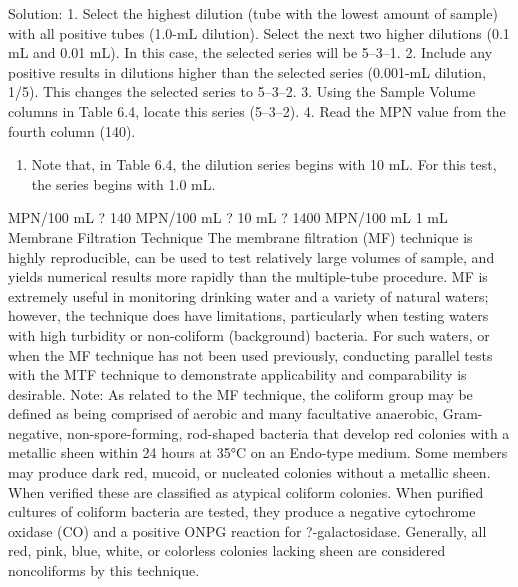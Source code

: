 \documentclass{article}
\begin{document}
Solution: 1. Select the highest dilution (tube with the lowest amount of
sample) with all positive tubes (1.0-mL dilution). Select the next two
higher dilutions (0.1 mL and 0.01 mL). In this case, the selected series
will be 5--3--1. 2. Include any positive results in dilutions higher
than the selected series (0.001-mL dilution, 1/5). This changes the
selected series to 5--3--2. 3. Using the Sample Volume columns in Table
6.4, locate this series (5--3--2). 4. Read the MPN value from the fourth
column (140).

\begin{enumerate}
\def\labelenumi{\arabic{enumi}.}
\setcounter{enumi}{4}
\tightlist
\item
  Note that, in Table 6.4, the dilution series begins with 10 mL. For
  this test, the series begins with 1.0 mL.
\end{enumerate}

MPN/100 mL ? 140 MPN/100 mL ? 10 mL ? 1400 MPN/100 mL 1 mL Membrane
Filtration Technique The membrane filtration (MF) technique is highly
reproducible, can be used to test relatively large volumes of sample,
and yields numerical results more rapidly than the multiple-tube
procedure. MF is extremely useful in monitoring drinking water and a
variety of natural waters; however, the technique does have limitations,
particularly when testing waters with high turbidity or non-coliform
(background) bacteria. For such waters, or when the MF technique has not
been used previously, conducting parallel tests with the MTF technique
to demonstrate applicability and comparability is desirable. Note: As
related to the MF technique, the coliform group may be defined as being
comprised of aerobic and many facultative anaerobic, Gram-negative,
non-spore-forming, rod-shaped bacteria that develop red colonies with a
metallic sheen within 24 hours at 35°C on an Endo-type medium. Some
members may produce dark red, mucoid, or nucleated colonies without a
metallic sheen. When verified these are classified as atypical coliform
colonies. When purified cultures of coliform bacteria are tested, they
produce a negative cytochrome oxidase (CO) and a positive ONPG reaction
for ?-galactosidase. Generally, all red, pink, blue, white, or colorless
colonies lacking sheen are considered noncoliforms by this technique.
\end{document}
